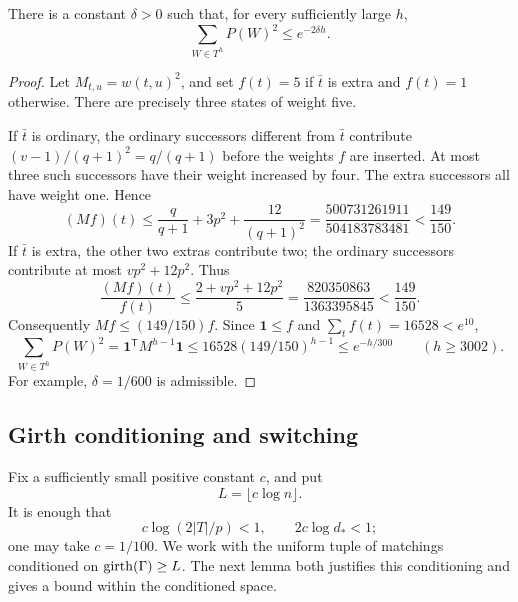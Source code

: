 \begin{lemma}\label{lem:squared-words}
There is a constant \(\delta>0\) such that, for every sufficiently large \(h\),
\begin{equation}\label{eq:squared-words}
 \sum_{W\in T^h}P(W)^2\le e^{-2\delta h}.
\end{equation}
\end{lemma}
\begin{proof}
Let \(M_{t,u}=w(t,u)^2\), and set \(f(t)=5\) if \(\bar t\) is extra and \(f(t)=1\) otherwise. There are precisely three states of weight five.

If \(\bar t\) is ordinary, the ordinary successors different from \(\bar t\) contribute \((v-1)/(q+1)^2=q/(q+1)\) before the weights \(f\) are inserted. At most three such successors have their weight increased by four. The extra successors all have weight one. Hence
\[
(Mf)(t)\le\frac{q}{q+1}+3p^2+\frac{12}{(q+1)^2}
 =\frac{500731261911}{504183783481}<\frac{149}{150}.
\]
If \(\bar t\) is extra, the other two extras contribute two; the ordinary successors contribute at most \(vp^2+12p^2\). Thus
\[
\frac{(Mf)(t)}{f(t)}
 \le\frac{2+vp^2+12p^2}{5}
 =\frac{820350863}{1363395845}<\frac{149}{150}.
\]
Consequently \(Mf\le(149/150)f\). Since \(\mathbf1\le f\) and
\(\sum_t f(t)=16528<e^{10}\),
\[
\sum_{W\in T^h}P(W)^2
=\mathbf1^{\mathsf T}M^{h-1}\mathbf1
\le16528(149/150)^{h-1}
\le e^{-h/300}\qquad(h\ge3002).
\]
For example, \(\delta=1/600\) is admissible.
\end{proof}

\subsection{Girth conditioning and switching}

Fix a sufficiently small positive constant \(c\), and put
\[
L=\lfloor c\log n\rfloor.
\]
It is enough that
\begin{equation}\label{eq:c-choice}
 c\log(2|T|/p)<1,\qquad 2c\log d_*<1;
\end{equation}
one may take \(c=1/100\). We work with the uniform tuple of matchings conditioned on \(\operatorname{girth}(\Gamma)\ge L\). The next lemma both justifies this conditioning and gives a bound within the conditioned space.

